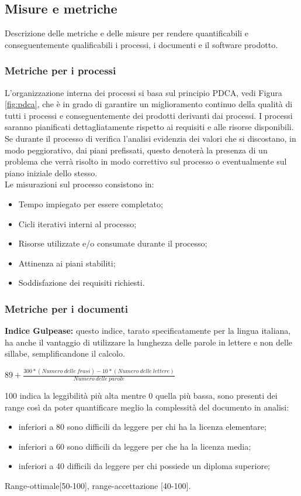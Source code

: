 	\subsection{Misure e metriche}
	Descrizione delle metriche e delle misure per rendere quantificabili e conseguentemente qualificabili i processi, i documenti e il software prodotto.

		\subsubsection{Metriche per i processi}
		L'organizzazione interna dei processi si basa sul principio PDCA, vedi Figura \ref{fig:pdca}, che è in grado di garantire un miglioramento continuo della qualità di tutti i processi e conseguentemente dei prodotti derivanti dai processi.
I processi saranno pianificati dettagliatamente rispetto ai requisiti e alle risorse disponibili. Se durante il processo di verifica l'analisi evidenzia dei valori che si discostano, in modo peggiorativo, dai piani prefissati, questo denoterà la presenza di un problema che verrà risolto in modo correttivo sul processo o eventualmente sul piano iniziale dello stesso.\\
		Le misurazioni sul processo consistono in:
			\begin{itemize}
				\item Tempo impiegato per essere completato;
				\item Cicli iterativi interni al processo;
				\item Risorse utilizzate e/o consumate durante il processo;
				\item Attinenza ai piani stabiliti;
				\item Soddisfazione dei requisiti richiesti.
			\end{itemize}

		\subsubsection{Metriche per i documenti}
		\textbf{Indice Gulpease\gloss{}:} questo indice, tarato specificatamente per la lingua italiana, ha anche il vantaggio di utilizzare la lunghezza delle parole in lettere e non delle sillabe, semplificandone il calcolo.
			\begin{center}
				\begin{math}
					89+\frac{300 * (Numero\ delle\ frasi) - 10 * (Numero\ delle\ lettere)}{Numero\ delle\ parole}
				\end{math}
			\end{center}
		100 indica la leggibilità più alta mentre 0 quella più bassa, sono presenti dei range così da poter quantificare meglio la complessità del documento in analisi:
			\begin{itemize}
				\item inferiori a 80 sono difficili da leggere per chi ha la licenza elementare;
				\item inferiori a 60 sono difficili da leggere per che ha la licenza media;
				\item inferiori a 40 difficili da leggere per chi possiede un diploma superiore;
			\end{itemize}
		Range-ottimale[50-100], range-accettazione [40-100].

